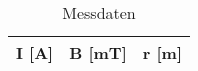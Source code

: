 \documentclass[captions=tableheading]{scrartcl}
\begin{document}


\begin{table}
  \centering
  \caption{Messdaten}
  \label{tab:some_data}
  \begin{tabular}{c c c  }
    \toprule
     I [A] &		B [mT]	& r [m]	 \\
    \midrule
      
    \bottomrule
  \end{tabular}
\end{table}

\end{document}
